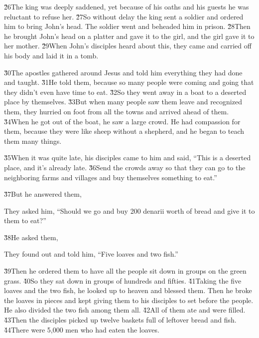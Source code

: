 \v{26}The king was deeply saddened, yet because of his oaths and his guests he was reluctant to refuse her. \v{27}So without delay the king sent a soldier and ordered him to bring John's head. The soldier went and beheaded him in prison. \v{28}Then he brought John's head on a platter and gave it to the girl, and the girl gave it to her mother. \v{29}When John's disciples heard about this, they came and carried off his body and laid it in a tomb.

\v{30}The apostles gathered around Jesus and told him everything they had done and taught. \v{31}He told them,  because so many people were coming and going that they didn't even have time to eat. \v{32}So they went away in a boat to a deserted place by themselves. \v{33}But when many people saw them leave and recognized them, they hurried on foot from all the towns and arrived ahead of them. \v{34}When he got out of the boat, he saw a large crowd. He had compassion for them, because they were like sheep without a shepherd, and he began to teach them many things.

\v{35}When it was quite late, his disciples came to him and said, ``This is a deserted place, and it's already late. \v{36}Send the crowds away so that they can go to the neighboring farms and villages and buy themselves something to eat.''

\v{37}But he answered them, 

They asked him, ``Should we go and buy 200 denarii worth of bread and give it to them to eat?''

\v{38}He asked them, 

They found out and told him, ``Five loaves and two fish.''

\v{39}Then he ordered them to have all the people sit down in groups on the green grass. \v{40}So they sat down in groups of hundreds and fifties. \v{41}Taking the five loaves and the two fish, he looked up to heaven and blessed them. Then he broke the loaves in pieces and kept giving them to his disciples to set before the people. He also divided the two fish among them all. \v{42}All of them ate and were filled. \v{43}Then the disciples picked up twelve baskets full of leftover bread and fish. \v{44}There were 5,000 men who had eaten the loaves.

